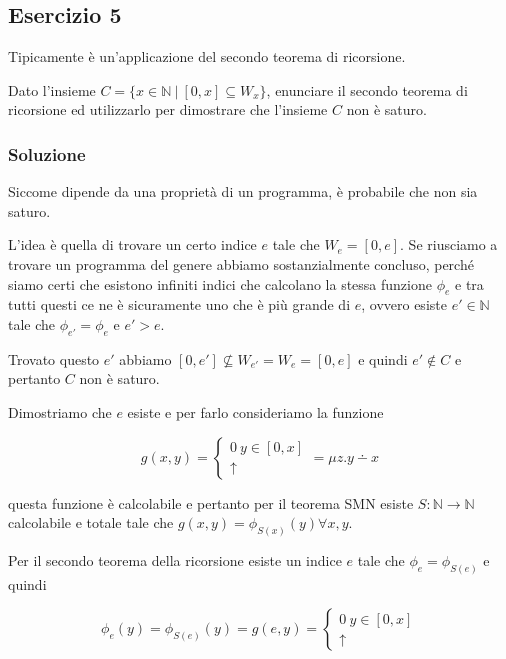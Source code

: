 
\subsection{Esercizio 5}

Tipicamente è un'applicazione del secondo teorema di ricorsione.

Dato l'insieme $C = \{ x \in \mathbb{N} \: | \: [0,x] \subseteq W_x \} $, enunciare il secondo teorema di ricorsione ed utilizzarlo per dimostrare che l'insieme $C$ non è saturo.

\subsubsection{Soluzione}

Siccome dipende da una proprietà di un programma, è probabile che non sia saturo.

L'idea è quella di trovare un certo indice $e$ tale che $W_e = [0,e]$. Se riusciamo a trovare un programma del genere abbiamo sostanzialmente concluso, perché siamo certi che esistono infiniti indici che calcolano la stessa funzione $\phi_e$ e tra tutti questi ce ne è sicuramente uno che è più grande di $e$, ovvero esiste $e' \in \mathbb{N}$ tale che $\phi_{e'} = \phi_e$ e $e' > e$.

Trovato questo $e'$ abbiamo $[0, e'] \nsubseteq W_{e'} = W_e = [0,e]$ e quindi $e' \notin C$ e pertanto $C$ non è saturo.

Dimostriamo che $e$ esiste e per farlo consideriamo la funzione

$$
g(x,y) = \begin{cases}
0 \: y \in [0,x] \\
\uparrow
\end{cases} = \mu z . y \dotminus x
$$

questa funzione è calcolabile e pertanto per il teorema SMN esiste $S : \mathbb{N} \rightarrow \mathbb{N}$ calcolabile e totale tale che $g(x,y) = \phi_{S(x)}(y) \forall x,y$.

Per il secondo teorema della ricorsione esiste un indice $e$ tale che $\phi_e = \phi_{S(e)}$ e quindi

$$
\phi_e(y) = \phi_{S(e)}(y) = g(e,y) = \begin{cases}
0 \: y \in [0,x] \\
\uparrow
\end{cases}
$$
 
